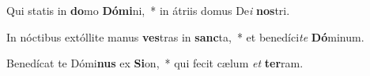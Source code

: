 \item Qui statis in \textbf{do}mo \textbf{Dó}\textbf{mi}ni,~* in átriis domus De\textit{i} \textbf{nos}tri.
\item In nóctibus extóllite manus \textbf{ves}tras in \textbf{sanc}ta,~* et benedíci\textit{te} \textbf{Dó}minum.
\item Benedícat te Dómi\textbf{nus} ex \textbf{Si}on,~* qui fecit cælum \textit{et} \textbf{ter}ram.
